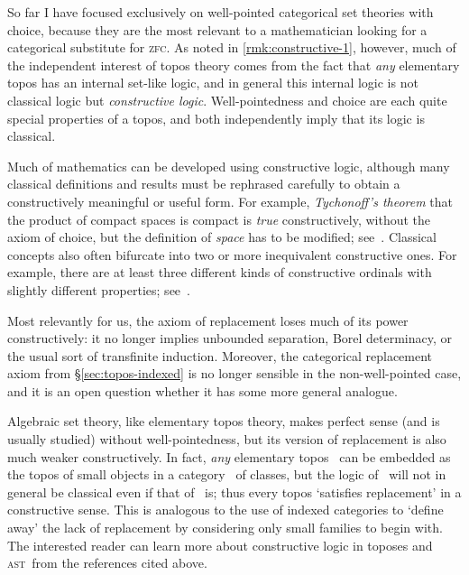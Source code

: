 \documentclass[12pt]{amsart}
\def\zfc{\textsc{zfc}}
\def\ast{\textsc{ast}}
\begin{document}

\begin{rmk}\label{rmk:constructive-2}
  So far I have focused exclusively on well-pointed categorical set
  theories with choice, because they are the most relevant to a
  mathematician looking for a categorical substitute for \zfc.  As
  noted in \autoref{rmk:constructive-1}, however, much of the
  independent interest of topos theory comes from the fact that
  \emph{any} elementary topos has an internal set-like logic, and in
  general this internal logic is not classical logic but
  \emph{constructive logic}.  Well-pointedness and choice are each
  quite special properties of a topos, and both independently imply
  that its logic is classical.

  Much of mathematics can be developed using constructive logic,
  although many classical definitions and results must be rephrased
  carefully to obtain a constructively meaningful or useful form.  For
  example, \emph{Tychonoff's theorem} that the product of compact
  spaces is compact is \emph{true} constructively, without the axiom
  of choice, but the definition of \emph{space} has to be modified;
  see~\cite[Part~C]{ptj:elephant}.  Classical concepts also often
  bifurcate into two or more inequivalent constructive ones.  For
  example, there are at least three different kinds of constructive
  ordinals with slightly different properties;
  see~\cite{jm:ast,taylor:ordinals}.

  Most relevantly for us, the axiom of replacement loses much of its
  power constructively: it no longer implies unbounded separation,
  Borel determinacy, or the usual sort of transfinite induction.
  Moreover, the categorical replacement axiom from
  \S\ref{sec:topos-indexed} is no longer sensible in the
  non-well-pointed case, and it is an open question whether it has
  some more general analogue.

  Algebraic set theory, like elementary topos theory, makes perfect
  sense (and is usually studied) without well-pointedness, but its
  version of replacement is also much weaker constructively.  In fact,
  \emph{any} elementary topos \bS\ can be embedded as the topos of
  small objects in a category \bC\ of classes, but the logic of \bC\
  will not in general be classical even if that of \bS\ is; thus every
  topos `satisfies replacement' in a constructive sense.  This is
  analogous to the use of indexed categories to `define away' the lack
  of replacement by considering only small families to begin with.
  The interested reader can learn more about constructive logic in
  toposes and \ast\ from the references cited above.
\end{rmk}
\end{document}
